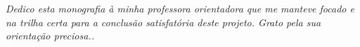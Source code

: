 	\begin{dedicatoria}
		\vspace*{\fill}
		\centering
		\noindent
		\textit{ Dedico esta monografia  à minha professora orientadora que me manteve focado e na trilha certa para a conclusão satisfatória deste projeto. Grato pela sua orientação preciosa..} \vspace*{\fill}
	\end{dedicatoria}